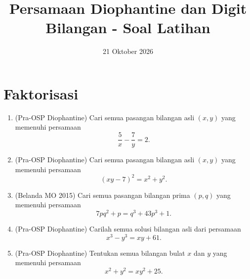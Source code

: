 \documentclass[12pt]{scrartcl}
\title{Persamaan Diophantine dan Digit Bilangan - Soal Latihan}
\date{21 Oktober 2026}
\begin{document}
\maketitle

\renewcommand*\contentsname{Daftar Isi}
\tableofcontents

\newpage

\section{Faktorisasi}
\begin{enumerate}

	\item (Pra-OSP Diophantine)
	Cari semua pasangan bilangan asli $(x, y)$ yang memenuhi persamaan
	\[ \frac{5}{x} - \frac{7}{y} = 2. \]

	\item (Pra-OSP Diophantine)
	Cari semua pasangan bilangan asli $(x, y)$ yang memenuhi persamaan
	\[ (xy - 7)^2 = x^2 + y^2. \]

	\item (Belanda MO 2015)
	Cari semua pasangan bilangan prima $(p, q)$ yang memenuhi persamaan
	\[ 7pq^2 + p = q^3 + 43p^3 + 1. \]

	\item (Pra-OSP Diophantine)
	Carilah semua solusi bilangan asli dari persamaan
	\[ x^3 - y^3 = xy + 61. \]

	\item (Pra-OSP Diophantine)
	Tentukan semua bilangan bulat $x$ dan $y$ yang memenuhi persamaan
	\[ x^2 + y^2 = xy^2 + 25. \]

\end{enumerate}
\end{document}
